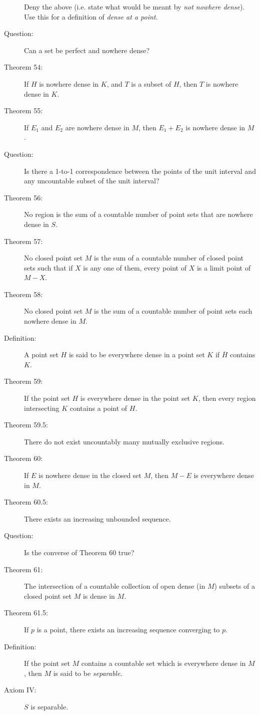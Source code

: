 \documentclass{article}
\begin{document}
\begin{description}
     Deny the above (i.e. state what would be meant by \emph{not nowhere dense}). Use this for a definition of \emph{dense at a point}.
  \item[Question:] Can a set be perfect and nowhere dense?
  \item[Theorem 54:] If $H$ is nowhere dense in $K$, and $T$ is a subset of $H$, then $T$ is nowhere dense in $K$.
  \item[Theorem 55:] If $E_{1}$ and $E_{2}$ are nowhere dense in $M$, then $E_{1}+E_{2}$ is nowhere dense in $M$.
  \item[Question:] Is there a 1-to-1 correspondence between the points of the unit interval and any uncountable subset of the unit interval?
  \item[Theorem 56:] No region is the sum of a countable number of point sets that are nowhere dense in $S$.
  \item[Theorem 57:] No closed point set $M$ is the sum of a countable number of closed point sets such that if $X$ is any one of them, every point of $X$ is a limit point of $M-X$.
  \item[Theorem 58:] No closed point set $M$ is the sum of a countable number of point sets each nowhere dense in $M$.
  \item[Definition:] A point set $H$ is said to be everywhere dense in a point set $K$ if $\overline{H}$ contains $K$.
  \item[Theorem 59:] If the point set $H$ is everywhere dense in the point set $K$, then every region intersecting $K$ contains a point of $H$.
  \item[Theorem 59.5:] There do not exist uncountably many mutually exclusive regions.
  \item[Theorem 60:] If $E$ is nowhere dense in the closed set $M$, then $M-E$ is everywhere dense in $M$.
  \item[Theorem 60.5:] There exists an increasing unbounded sequence.
  \item[Question:] Is the converse of Theorem 60 true?
  \item[Theorem 61:] The intersection of a countable collection of open dense (in $M$) subsets of a closed point set $M$ is dense in $M$.
  \item[Theorem 61.5:] If $p$ is a point, there exists an increasing sequence converging to $p$.
  \item[Definition:] If the point set $M$ contains a countable set which is everywhere dense in $M$, then $M$ is said to be \emph{separable}.
  \item[Axiom IV:] $S$ is separable.

\end{description}
\end{document}
